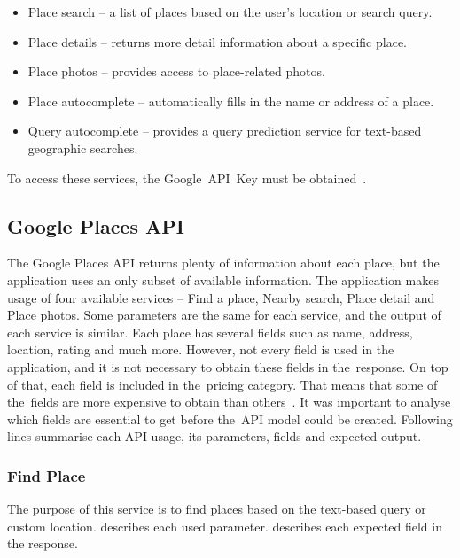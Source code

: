 \begin{itemize}
    \item Place search -- a list of places based on the user's location or search query.
    \item Place details -- returns more detail information about a specific place.
    \item Place photos -- provides access to place-related photos.
    \item Place autocomplete -- automatically fills in the name or address of a place.
    \item Query autocomplete -- provides a query prediction service for text-based geographic searches.
\end{itemize}

To access these services, the Google~API~Key must be obtained~\cite{google-places-api-key}.
\subsection{Google Places API}
The Google Places API returns plenty of information about each place, but the application uses an only subset of available information. The application makes usage of four available services -- Find a place, Nearby search, Place detail and Place photos. Some parameters are the same for each service, and the output of each service is similar. 
Each place has several fields such as name, address, location, rating and much more. However, not every field is used in the application, and it is not necessary to obtain these fields in the~response. On top of that, each field is included in the~pricing category. That means that some of the~fields are more expensive to obtain than others~\cite{google-places-api-billing}. It was important to analyse which fields are essential to get before the~API model could be created. Following lines summarise each API usage, its parameters, fields and expected output.
\subsubsection{Find Place}
The purpose of this service is to find places based on the text-based query or custom location.  describes each used parameter.  describes each expected field in the response. 

